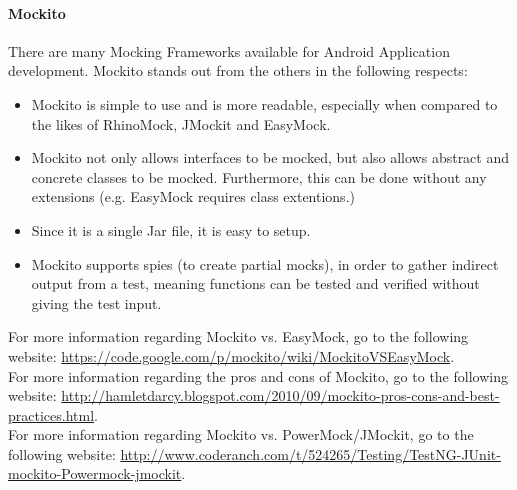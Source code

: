 \documentclass[11pt,a4paper,titlepage]{article}
\begin{document}
			\paragraph{Mockito}
		There are many Mocking Frameworks available for Android Application development. 
		Mockito stands out from the others in the following respects:
			\begin{itemize}
				\item Mockito is simple to use and is more readable, especially when compared to the likes of RhinoMock, JMockit and EasyMock.
				\item Mockito not only allows interfaces to be mocked, but also allows abstract and concrete classes to be mocked. Furthermore, this can be done without any extensions (e.g. EasyMock requires class extentions.)
				\item Since it is a single Jar file, it is easy to setup. 
				\item Mockito supports spies (to create partial mocks), in order to gather indirect output from a test, meaning functions can be tested and verified without giving the test input. 
				\end{itemize}
				For more information regarding Mockito vs. EasyMock, go to the following website:  \url{https://code.google.com/p/mockito/wiki/MockitoVSEasyMock}. \newline
				\hfill\\
				For more information regarding the pros and cons of Mockito, go to the following website:  \url{http://hamletdarcy.blogspot.com/2010/09/mockito-pros-cons-and-best-practices.html}. \newline
\hfill\\
				For more information regarding Mockito vs. PowerMock/JMockit, go to the following website:  \url{http://www.coderanch.com/t/524265/Testing/TestNG-JUnit-mockito-Powermock-jmockit}. \newline
\end{document}
